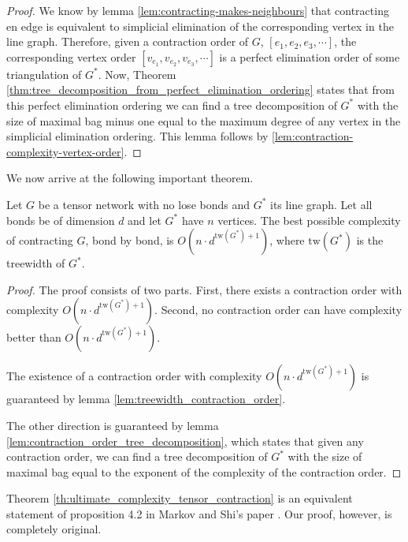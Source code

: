 \begin{proof}
	We know by lemma \ref{lem:contracting-makes-neighbours} that contracting en edge is equivalent to simplicial elimination of the corresponding vertex in the line graph.
	Therefore, given a contraction order of $G$, $[e_1, e_2, e_3, \cdots]$, the corresponding vertex order $[v_{e_1}, v_{e_2}, v_{e_3}, \cdots]$ is a perfect elimination order of some triangulation of $G^*$.
	Now, Theorem \ref{thm:tree_decomposition_from_perfect_elimination_ordering} states that from this perfect elimination ordering we can find a tree decomposition of $G^*$ with the size of maximal bag minus one equal to the maximum degree of any vertex in the simplicial elimination ordering.
	This lemma follows by \ref{lem:contraction-complexity-vertex-order}.
\end{proof}

We now arrive at the following important theorem.

\begin{theorem}\label{th:ultimate_complexity_tensor_contraction}
	Let $G$ be a tensor network with no lose bonds and $G^*$ its line graph.
	Let all bonds be of dimension $d$ and let $G^*$ have $n$ vertices.
	The best possible complexity of contracting $G$, bond by bond, is $O(n \cdot d^{\text{tw}(G^*) + 1})$, where $\text{tw}(G^*)$ is the treewidth of $G^*$.
\end{theorem}


\begin{proof}
	The proof consists of two parts. First, there exists a contraction order with complexity $O(n \cdot d^{\text{tw}(G^*) + 1})$.
	Second, no contraction order can have complexity better than $O(n \cdot d^{\text{tw}(G^*) + 1})$.

	The existence of a contraction order with complexity $O(n \cdot d^{\text{tw}(G^*) + 1})$ is guaranteed by lemma \ref{lem:treewidth_contraction_order}.

	The other direction is guaranteed by lemma \ref{lem:contraction_order_tree_decomposition}, which states that given any contraction order, we can find a tree decomposition of $G^*$ with the size of maximal bag equal to the exponent of the complexity of the contraction order.
\end{proof}

Theorem \ref{th:ultimate_complexity_tensor_contraction} is an equivalent statement of proposition 4.2 in Markov and Shi's paper \cite{Markov_2008}.
Our proof, however, is completely original.

